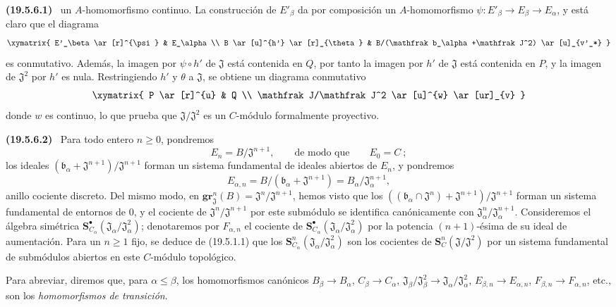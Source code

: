 \documentclass[10pt,oneside]{book}
\makeatletter
\newcommand{\setmanualcurrentlabel}[1]{\def\@currentlabel{#1}}
\newcommand{\oldpage}[2][]{%
  \setcounter{footnote}{0}%
  \marginpar{\scriptsize\textbf{#1}~|~#2}\ignorespaces}
\newenvironment{env}[1][]{\setmanualcurrentlabel{#1}\par\medskip\noindent\textbf{(#1)}\ }{\par}
\makeatother
\begin{document}
\begin{env}[19.5.6.1]
un $A$-homomorfismo continuo. La construcción de $E'_\beta$ da por
composición un $A$-homomorfismo $\psi:E'_\beta\to E_\beta\to E_\alpha$, y
está claro que el diagrama
\[
  \xymatrix{
    E'_\beta \ar[r]^{\psi} & E_\alpha \\
    B \ar[u]^{h'} \ar[r]_{\theta} &
    B/(\mathfrak b_\alpha+\mathfrak J^2) \ar[u]_{v'_*}
  }
\]
es conmutativo. Además, la imagen por $\psi\circ h'$ de $\mathfrak J$ está
contenida en $Q$, por tanto la imagen por $h'$ de $\mathfrak J$ está contenida en
$P$, y la imagen de $\mathfrak J^2$ por $h'$ es nula. Restringiendo $h'$ y
$\theta$ a $\mathfrak J$, se obtiene un diagrama conmutativo
\[
  \xymatrix{
    P \ar[r]^{u} & Q \\
    \mathfrak J/\mathfrak J^2 \ar[u]^{w} \ar[ur]_{v}
  }
\]
donde $w$ es continuo, lo que prueba que
$\mathfrak J/\mathfrak J^2$ es un $C$-módulo formalmente proyectivo.
\end{env}

\oldpage[0\textsubscript{IV-1}]{95}

\begin{env}[19.5.6.2]
\label{0.19.5.6.2-es}
Para todo entero $n\geq0$, pondremos
\[
  E_n=B/\mathfrak J^{n+1},
  \qquad\text{de modo que}\qquad E_0=C~;
\]
los ideales $(\mathfrak b_\alpha+\mathfrak J^{n+1})/\mathfrak J^{n+1}$ forman
un sistema fundamental de ideales abiertos de $E_n$, y pondremos
\[
  E_{\alpha,n}=B/(\mathfrak b_\alpha+\mathfrak J^{n+1})
  =B_\alpha/\mathfrak J_\alpha^{n+1},
\]
anillo cociente discreto. Del mismo modo, en
$\mathbf{gr}_{\mathfrak J}^n(B)=\mathfrak J^n/\mathfrak J^{n+1}$, hemos visto que los
$((\mathfrak b_\alpha\cap\mathfrak J^n)+\mathfrak J^{n+1})/
\mathfrak J^{n+1}$ forman un sistema fundamental de entornos de $0$, y el
cociente de $\mathfrak J^n/\mathfrak J^{n+1}$ por este submódulo se identifica
canónicamente con $\mathfrak J_\alpha^n/\mathfrak J_\alpha^{n+1}$. Consideremos
el álgebra simétrica
$\mathbf S_{C_\alpha}^\bullet(\mathfrak J_\alpha/\mathfrak J_\alpha^2)$; denotaremos
por $F_{\alpha,n}$ el cociente de
$\mathbf S_{C_\alpha}^\bullet(\mathfrak J_\alpha/\mathfrak J_\alpha^2)$ por la
potencia $(n+1)$-ésima de su ideal de aumentación. Para un $n\geq1$ fijo, se
deduce de (19.5.1.1) que los
$\mathbf S_{C_\alpha}^n(\mathfrak J_\alpha/\mathfrak J_\alpha^2)$ son los
cocientes de $\mathbf S_C^n(\mathfrak J/\mathfrak J^2)$ por un sistema
fundamental de submódulos abiertos en este $C$-módulo topológico.

Para abreviar, diremos que, para $\alpha\leq\beta$, los homomorfismos canónicos
$B_\beta\to B_\alpha$, $C_\beta\to C_\alpha$,
$\mathfrak J_\beta/\mathfrak J_\beta^2\to
\mathfrak J_\alpha/\mathfrak J_\alpha^2$, $E_{\beta,n}\to E_{\alpha,n}$,
$F_{\beta,n}\to F_{\alpha,n}$, etc., son los \emph{homomorfismos de
transición}.
\end{env}
\end{document}
